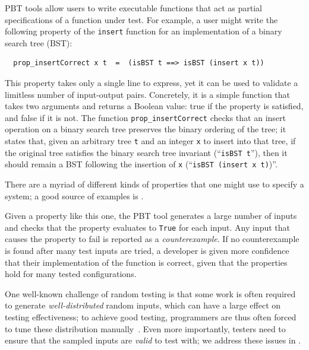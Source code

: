 
PBT tools allow users to write executable functions
that act as partial
specifications of a function under test. For example, a user might
write the following property of the \lstinline{insert}
function for an implementation of a binary search tree (BST):
\begin{lstlisting}
  prop_insertCorrect x t  =  (isBST t ==> isBST (insert x t))
\end{lstlisting}
This property takes only a single
line to express, yet it can be used to validate a limitless number of
input-output pairs. Concretely, it is
a simple function that takes two arguments and returns a
Boolean value: true if the property is satisfied, and false if it is
not. The function \texttt{prop\_insertCorrect} checks
that an insert operation on a binary search tree preserves the
binary ordering of the tree; it states
that, given an arbitrary tree \texttt{t} and an integer
\texttt{x} to insert into that tree, if the original tree
satisfies the
binary search tree invariant (``\texttt{isBST t}''), then it should remain
a BST following the insertion of \texttt{x} (``\texttt{isBST (insert x t)})''.

\iflater {}There are a
myriad of different kinds of properties that one might use to specify
a system; a good source of examples is \citet{HowToSpecifyIt}.  \fi

Given a property like this one, the PBT tool generates a large number of inputs and
checks that the property evaluates to \lstinline{True} for each input.
Any input that causes the property to fail is reported as a {\em
counterexample}. If no counterexample is found after many test
inputs are tried, a developer is given more confidence that their implementation
of the function is correct, given that the properties hold for many
tested configurations.


One well-known challenge of random testing is that some work is often
required to generate {\em well-distributed} random inputs, which can
have a large effect on testing effectiveness; to achieve good testing,
programmers are thus often forced to tune these distribution
manually~\cite{DBLP:conf/icfp/ClaessenH00}. Even more importantly,
testers need to ensure that the sampled inputs are {\em valid} to test
with; we address these issues in .

